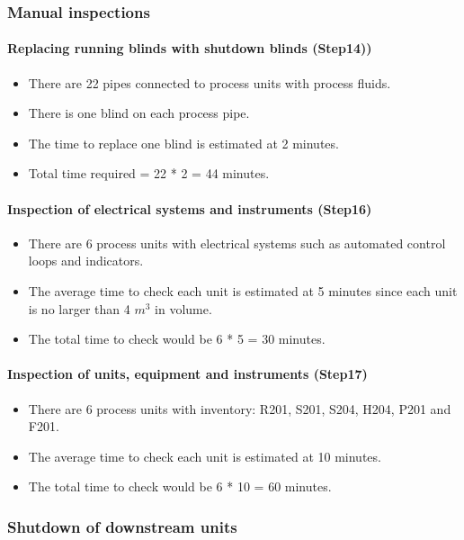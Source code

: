 \subsubsection{Manual inspections} 
\paragraph{Replacing running blinds with shutdown blinds (Step14))}
    \begin{itemize}
        \item There are 22 pipes connected to process units with process fluids.
        \item There is one blind on each process pipe.
        \item The time to replace one blind is estimated at 2 minutes.
        \item Total time required = 22 * 2 = 44 minutes.
    \end{itemize}
    
\paragraph{Inspection of electrical systems and instruments (Step16)}
    \begin{itemize}
        \item There are 6 process units with electrical systems such as automated control loops and indicators.
        \item The average time to check each unit is estimated at 5 minutes since each unit is no larger than 4 $m^3$ in volume.
        \item The total time to check would be 6 * 5 = 30 minutes.
    \end{itemize}
    
\paragraph{Inspection of units, equipment and instruments (Step17)}
    \begin{itemize}
        \item There are 6 process units with inventory: R201, S201, S204, H204, P201 and F201.
        \item The average time to check each unit is estimated at 10 minutes.
        \item The total time to check would be 6 * 10 = 60 minutes.
    \end{itemize}

\subsubsection{Shutdown of downstream units}
